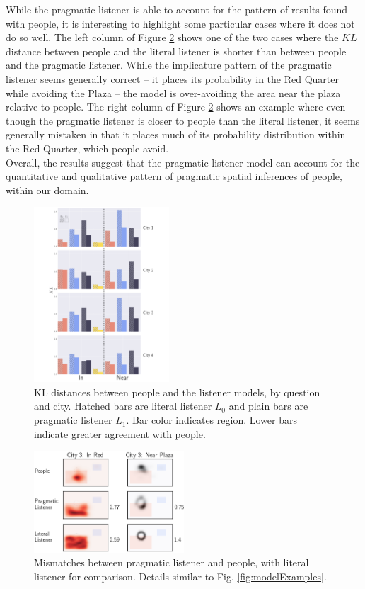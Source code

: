\documentclass[10pt,letterpaper]{article}
\begin{document}
While the pragmatic listener is able to account for the pattern of results found with people, it is interesting to highlight some particular cases where it does not do so well. The left column of Figure \ref{fig:modelProbs} shows one of the two cases where the $KL$ distance between people and the literal listener is shorter than between people and the pragmatic listener.  While the implicature pattern of the pragmatic listener seems generally correct -- it places its probability in the Red Quarter while avoiding the Plaza -- the model is over-avoiding the area near the plaza relative to people. The right column of Figure \ref{fig:modelProbs} shows an example where even though the pragmatic listener is closer to people than the literal listener, it seems generally mistaken in that it places much of its probability distribution within the Red Quarter, which people avoid. 
\\

Overall, the results suggest that the pragmatic listener model can account for the quantitative and qualitative pattern of pragmatic spatial inferences of people, within our domain. 

\begin{figure}[!t]
\center
\includegraphics[width=0.45\textwidth]{figures/KL.pdf}
\caption{KL distances between people and the listener models, by question and city. Hatched bars are literal listener $L_0$ and plain bars are  pragmatic listener $L_1$. Bar color indicates region. Lower bars indicate greater agreement with people.}
\label{fig:KL}
\end{figure}


\begin{figure}[!b]
\center
\includegraphics[width=0.5\textwidth]{figures/Figure5.png}
\caption{Mismatches between pragmatic listener and people, with literal listener for comparison. Details similar to Fig. \ref{fig:modelExamples}.}
\label{fig:modelProbs}
\end{figure}
\end{document}
